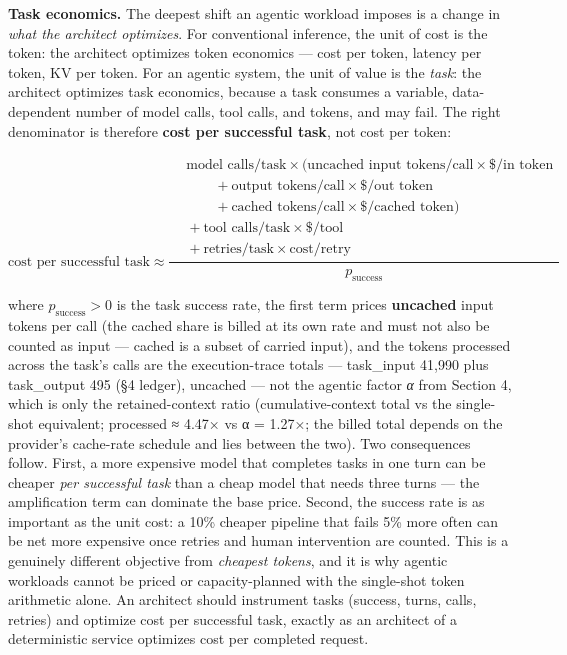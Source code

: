 \textbf{Task economics.} The deepest shift an agentic workload imposes
is a change in \emph{what the architect optimizes}. For conventional
inference, the unit of cost is the token: the architect optimizes token
economics --- cost per token, latency per token, KV per token. For an
agentic system, the unit of value is the \emph{task}: the architect
optimizes task economics, because a task consumes a variable,
data-dependent number of model calls, tool calls, and tokens, and may
fail. The right denominator is therefore \textbf{cost per successful
task}, not cost per token:

\[
\text{cost per successful task} \approx \frac{\begin{aligned}
&\text{model calls/task} \times (\text{uncached input tokens/call} \times \$/\text{in token} \\
&\qquad + \text{output tokens/call} \times \$/\text{out token} \\
&\qquad + \text{cached tokens/call} \times \$/\text{cached token}) \\
&{}+ \text{tool calls/task} \times \$/\text{tool} \\
&{}+ \text{retries/task} \times \text{cost/retry}
\end{aligned}}{p_{\text{success}}}
\]

where \(p_\text{success} > 0\) is the task success rate, the first term
prices \textbf{uncached} input tokens per call (the cached share is
billed at its own rate and must not also be counted as input --- cached
is a subset of carried input), and the tokens processed across the
task's calls are the execution-trace totals --- task\_input 41,990 plus
task\_output 495 (§4 ledger), uncached --- not the agentic factor
\emph{α} from Section 4, which is only the retained-context ratio
(cumulative-context total vs the single-shot equivalent; processed ≈
4.47× vs α = 1.27×; the billed total depends on the provider's
cache-rate schedule and lies between the two). Two consequences follow.
First, a more expensive model that completes tasks in one turn can be
cheaper \emph{per successful task} than a cheap model that needs three
turns --- the amplification term can dominate the base price. Second,
the success rate is as important as the unit cost: a 10\% cheaper
pipeline that fails 5\% more often can be net more expensive once
retries and human intervention are counted. This is a genuinely
different objective from \emph{cheapest tokens}, and it is why agentic
workloads cannot be priced or capacity-planned with the single-shot
token arithmetic alone. An architect should instrument tasks (success,
turns, calls, retries) and optimize cost per successful task, exactly as
an architect of a deterministic service optimizes cost per completed
request.


